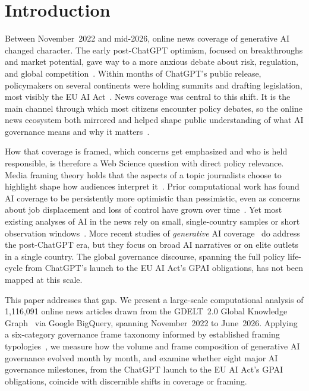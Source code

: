 \documentclass[sigconf]{acmart}
\begin{document}
\maketitle

\section{Introduction}

Between November~2022 and mid-2026, online news coverage of generative AI changed character. The early post-ChatGPT optimism, focused on breakthroughs and market potential, gave way to a more anxious debate about risk, regulation, and global competition~\cite{taeihagh_governance_2025,cheung_generative_2025}.
Within months of ChatGPT's public release, policymakers on several continents were holding summits and drafting legislation, most visibly the EU AI Act~\cite{gstrein_general-purpose_2024}.
News coverage was central to this shift. It is the main channel through which most citizens encounter policy debates, so the online news ecosystem both mirrored and helped shape public understanding of what AI governance means and why it matters~\cite{lazer_computational_2009}.

How that coverage is framed, which concerns get emphasized and who is held responsible, is therefore a Web Science question with direct policy relevance.
Media framing theory holds that the aspects of a topic journalists choose to highlight shape how audiences interpret it~\cite{entman_framing_1993}. Prior computational work has found AI coverage to be persistently more optimistic than pessimistic, even as concerns about job displacement and loss of control have grown over time~\cite{fast_long-term_2017}.
Yet most existing analyses of AI in the news rely on small, single-country samples or short observation windows~\cite{chuan_framing_2019,eisenbeis_ai_2024}.
More recent studies of \emph{generative} AI coverage~\cite{hendrickx_tool_2026,nguyen_generative_2026,lee_framing_2026} do address the post-ChatGPT era, but they focus on broad AI narratives or on elite outlets in a single country. The global governance discourse, spanning the full policy life-cycle from ChatGPT's launch to the EU AI Act's GPAI obligations, has not been mapped at this scale.

This paper addresses that gap.
We present a large-scale computational analysis of 1,116,091 online news articles drawn from the GDELT~2.0 Global Knowledge Graph~\cite{kalev_gdelt_2013} via Google BigQuery, spanning November~2022 to June~2026.
Applying a six-category governance frame taxonomy informed by established framing typologies~\cite{semetko_framing_2000}, we measure how the volume and frame composition of generative AI governance evolved month by month, and examine whether eight major AI governance milestones, from the ChatGPT launch to the EU AI Act's GPAI obligations, coincide with discernible shifts in coverage or framing.
\end{document}
